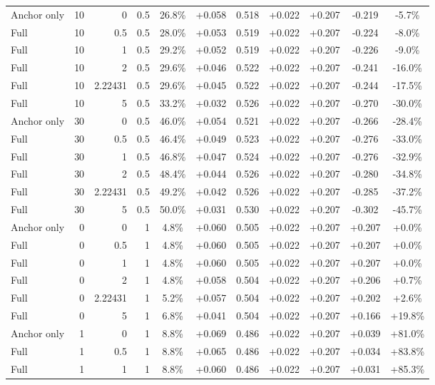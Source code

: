 \begin{table}[htbp]
\begin{tabular}{lrrrccccccc}
Anchor only & 10 & 0 & 0.5 & 26.8\% & +0.058 & 0.518 & +0.022 & +0.207 & -0.219 & -5.7\% \\
Full & 10 & 0.5 & 0.5 & 28.0\% & +0.053 & 0.519 & +0.022 & +0.207 & -0.224 & -8.0\% \\
Full & 10 & 1 & 0.5 & 29.2\% & +0.052 & 0.519 & +0.022 & +0.207 & -0.226 & -9.0\% \\
Full & 10 & 2 & 0.5 & 29.6\% & +0.046 & 0.522 & +0.022 & +0.207 & -0.241 & -16.0\% \\
Full & 10 & 2.22431 & 0.5 & 29.6\% & +0.045 & 0.522 & +0.022 & +0.207 & -0.244 & -17.5\% \\
Full & 10 & 5 & 0.5 & 33.2\% & +0.032 & 0.526 & +0.022 & +0.207 & -0.270 & -30.0\% \\
Anchor only & 30 & 0 & 0.5 & 46.0\% & +0.054 & 0.521 & +0.022 & +0.207 & -0.266 & -28.4\% \\
Full & 30 & 0.5 & 0.5 & 46.4\% & +0.049 & 0.523 & +0.022 & +0.207 & -0.276 & -33.0\% \\
Full & 30 & 1 & 0.5 & 46.8\% & +0.047 & 0.524 & +0.022 & +0.207 & -0.276 & -32.9\% \\
Full & 30 & 2 & 0.5 & 48.4\% & +0.044 & 0.526 & +0.022 & +0.207 & -0.280 & -34.8\% \\
Full & 30 & 2.22431 & 0.5 & 49.2\% & +0.042 & 0.526 & +0.022 & +0.207 & -0.285 & -37.2\% \\
Full & 30 & 5 & 0.5 & 50.0\% & +0.031 & 0.530 & +0.022 & +0.207 & -0.302 & -45.7\% \\
Anchor only & 0 & 0 & 1 & 4.8\% & +0.060 & 0.505 & +0.022 & +0.207 & +0.207 & +0.0\% \\
Full & 0 & 0.5 & 1 & 4.8\% & +0.060 & 0.505 & +0.022 & +0.207 & +0.207 & +0.0\% \\
Full & 0 & 1 & 1 & 4.8\% & +0.060 & 0.505 & +0.022 & +0.207 & +0.207 & +0.0\% \\
Full & 0 & 2 & 1 & 4.8\% & +0.058 & 0.504 & +0.022 & +0.207 & +0.206 & +0.7\% \\
Full & 0 & 2.22431 & 1 & 5.2\% & +0.057 & 0.504 & +0.022 & +0.207 & +0.202 & +2.6\% \\
Full & 0 & 5 & 1 & 6.8\% & +0.041 & 0.504 & +0.022 & +0.207 & +0.166 & +19.8\% \\
Anchor only & 1 & 0 & 1 & 8.8\% & +0.069 & 0.486 & +0.022 & +0.207 & +0.039 & +81.0\% \\
Full & 1 & 0.5 & 1 & 8.8\% & +0.065 & 0.486 & +0.022 & +0.207 & +0.034 & +83.8\% \\
Full & 1 & 1 & 1 & 8.8\% & +0.060 & 0.486 & +0.022 & +0.207 & +0.031 & +85.3\% \\

\end{tabular}
\end{table}

